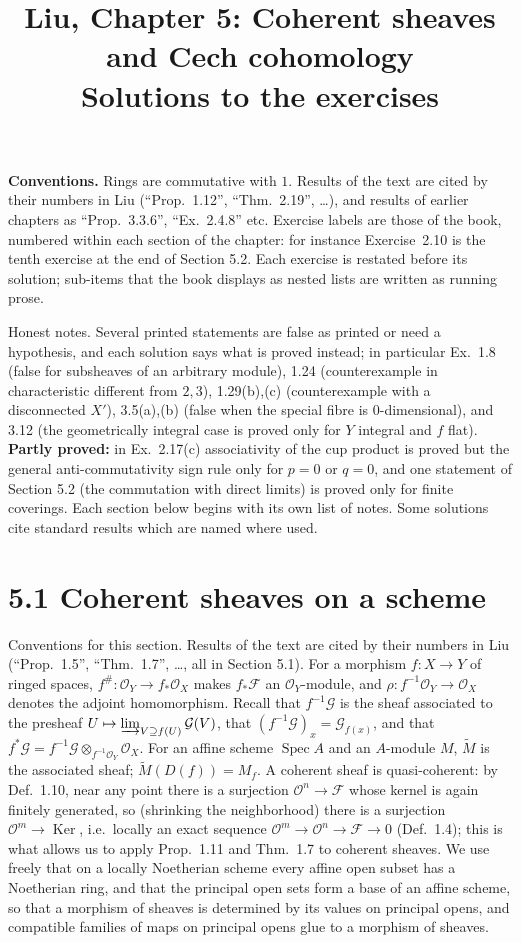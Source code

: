 \documentclass[11pt]{article}
\title{Liu, Chapter 5: Coherent sheaves and Cech cohomology\\[2pt]\large Solutions to the exercises}
\author{}
\date{}
\begin{document}
\maketitle
\noindent\textbf{Conventions.} Rings are commutative with $1$. Results of the text are cited by their numbers in Liu (``Prop.~1.12'', ``Thm.~2.19'', \dots), and results of earlier chapters as ``Prop.~3.3.6'', ``Ex.~2.4.8'' etc. Exercise labels are those of the book, numbered within each section of the chapter: for instance Exercise~2.10 is the tenth exercise at the end of Section 5.2. Each exercise is restated before its solution; sub-items that the book displays as nested lists are written as running prose.

Honest notes. Several printed statements are false as printed or need a hypothesis, and each solution says what is proved instead; in particular Ex.~1.8 (false for subsheaves of an arbitrary module), 1.24 (counterexample in characteristic different from $2,3$), 1.29(b),(c) (counterexample with a disconnected $X'$), 3.5(a),(b) (false when the special fibre is $0$-dimensional), and 3.12 (the geometrically integral case is proved only for $Y$ integral and $f$ flat). \textbf{Partly proved:} in Ex.~2.17(c) associativity of the cup product is proved but the general anti-commutativity sign rule only for $p=0$ or $q=0$, and one statement of Section 5.2 (the commutation with direct limits) is proved only for finite coverings. Each section below begins with its own list of notes. Some solutions cite standard results which are named where used.

\section*{5.1 Coherent sheaves on a scheme}

Conventions for this section. Results of the text are cited by their numbers in Liu (``Prop.~1.5'', ``Thm.~1.7'', \dots, all in Section 5.1). For a morphism $f:X\to Y$ of ringed spaces, $f^\#:\mathcal{O}_Y\to f_*\mathcal{O}_X$ makes $f_*\mathcal{F}$ an $\mathcal{O}_Y$-module, and $\rho:f^{-1}\mathcal{O}_Y\to\mathcal{O}_X$ denotes the adjoint homomorphism. Recall that $f^{-1}\mathcal{G}$ is the sheaf associated to the presheaf $U\mapsto\varinjlim_{V\supseteq f(U)}\mathcal{G}(V)$, that $(f^{-1}\mathcal{G})_x=\mathcal{G}_{f(x)}$, and that $f^*\mathcal{G}=f^{-1}\mathcal{G}\otimes_{f^{-1}\mathcal{O}_Y}\mathcal{O}_X$. For an affine scheme $\operatorname{Spec}A$ and an $A$-module $M$, $\widetilde M$ is the associated sheaf; $\widetilde M(D(f))=M_f$. A coherent sheaf is quasi-coherent: by Def.~1.10, near any point there is a surjection $\mathcal{O}^n\to\mathcal{F}$ whose kernel is again finitely generated, so (shrinking the neighborhood) there is a surjection $\mathcal{O}^m\to\operatorname{Ker}$, i.e.\ locally an exact sequence $\mathcal{O}^m\to\mathcal{O}^n\to\mathcal{F}\to0$ (Def.~1.4); this is what allows us to apply Prop.~1.11 and Thm.~1.7 to coherent sheaves. We use freely that on a locally Noetherian scheme every affine open subset has a Noetherian ring, and that the principal open sets form a base of an affine scheme, so that a morphism of sheaves is determined by its values on principal opens, and compatible families of maps on principal opens glue to a morphism of sheaves.
\end{document}
